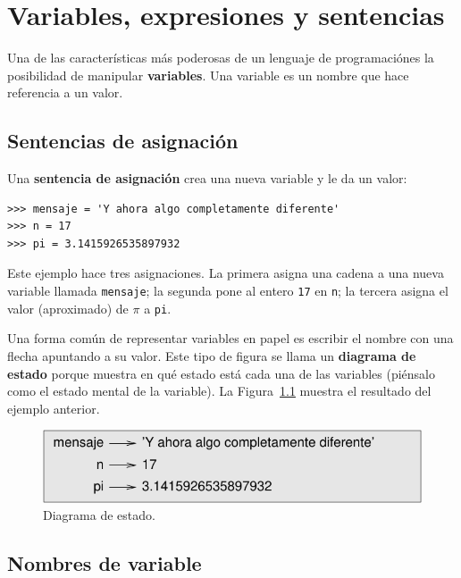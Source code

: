 \documentclass[10pt]{book}
\begin{document}
\chapter{Variables, expresiones y sentencias}

Una de las características más poderosas de un lenguaje de programaciónes la
posibilidad de manipular {\bf variables}.  Una variable es un nombre que
hace referencia a un valor.


\section{Sentencias de asignación}
\label{variables}

Una {\bf sentencia de asignación} crea una nueva variable y le da
un valor:

\begin{verbatim}
>>> mensaje = 'Y ahora algo completamente diferente'
>>> n = 17
>>> pi = 3.1415926535897932
\end{verbatim}
%
Este ejemplo hace tres asignaciones.  La primera asigna una cadena
a una nueva variable llamada {\tt mensaje};
la segunda pone al entero {\tt 17} en {\tt n}; la tercera
asigna el valor (aproximado) de $\pi$ a {\tt pi}.

Una forma común de representar variables en papel es escribir el nombre con
una flecha apuntando a su valor.  Este tipo de figura se
llama un {\bf diagrama de estado} porque muestra en qué estado está cada una
de las variables (piénsalo como el estado mental de la variable).
La Figura~\ref{fig.state2} muestra el resultado del ejemplo anterior.

\begin{figure}
\centerline
{\includegraphics[scale=0.8]{figs/state2.pdf}}
\caption{Diagrama de estado.}
\label{fig.state2}
\end{figure}



\section{Nombres de variable}
\end{document}
